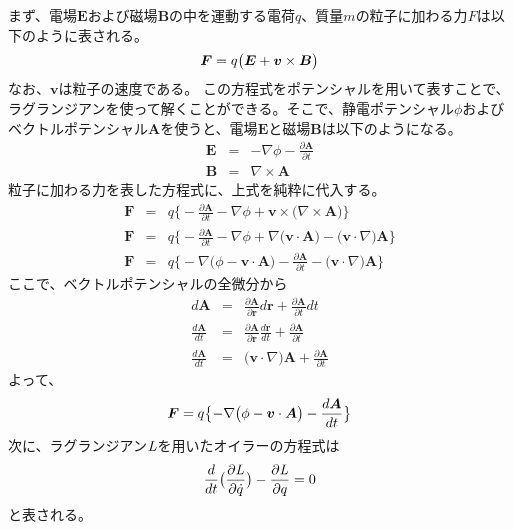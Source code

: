 \documentclass[11pt,a4paper]{jsarticle}
\begin{document}
まず、電場$\bm{E}$および磁場$\bm{B}$の中を運動する電荷$q$、質量$m$の粒子に加わる力$F$は以下のように表される。
\begin{equation}
  \bm{F} = q\bigl( \bm{E} + \bm{v} \times \bm{B} \bigr)\\
\end{equation}
なお、$\bm{v}$は粒子の速度である。
この方程式をポテンシャルを用いて表すことで、ラグランジアンを使って解くことができる。そこで、静電ポテンシャル$\phi$およびベクトルポテンシャル$\bm{A}$を使うと、電場$\bm{E}$と磁場$\bm{B}$は以下のようになる。
\begin{eqnarray}
  \bm{E} &=& - \nabla \phi - \frac{\partial \bm{A}}{\partial t} \\
  \bm{B} &=& \nabla \times \bm{A}
\end{eqnarray}
粒子に加わる力を表した方程式に、上式を純粋に代入する。
\begin{eqnarray}
  \bm{F} &=& q\bigl\{ -\frac{\partial \bm{A}}{\partial t} - \nabla \phi + \bm{v} \times \bigl( \nabla \times \bm{A} \bigr) \bigr\}\\
  \bm{F} &=& q\bigl\{ -\frac{\partial \bm{A}}{\partial t} - \nabla \phi + \nabla \bigl( \bm{v} \cdot \bm{A} \bigr) - \bigl( \bm{v} \cdot \nabla \bigr)\bm{A}\bigr\}\\
  \bm{F} &=& q\bigl\{ -\nabla \bigl( \phi - \bm{v} \cdot \bm{A} \bigr) - \frac{\partial \bm{A}}{\partial t} - \bigl( \bm{v} \cdot \nabla \bigr)\bm{A}\bigr\}
\end{eqnarray}
ここで、ベクトルポテンシャルの全微分から
\begin{eqnarray}
  d \bm{A} &=& \frac{\partial \bm{A}}{\partial \bm{r}} d \bm{r} + \frac{\partial \bm{A}}{\partial t} dt\\
  \frac{d \bm{A}}{dt} &=& \frac{\partial \bm{A}}{\partial \bm{r}} \frac{d \bm{r}}{dt} + \frac{\partial \bm{A}}{\partial t}\\
  \frac{d \bm{A}}{dt} &=& \bigl(\bm{v} \cdot \nabla \bigr)\bm{A} + \frac{\partial \bm{A}}{\partial t}
\end{eqnarray}
よって、
\begin{equation}
  \bm{F} = q\bigl\{ -\nabla \bigl( \phi - \bm{v} \cdot \bm{A} \bigr) -\frac{d \bm{A}}{dt} \bigr\}\\
\end{equation}
次に、ラグランジアン$\it{L}$を用いたオイラーの方程式は
\begin{equation}
  \frac{d}{dt}\bigl( \frac{\partial \it{L}}{\partial \dot{q}} \bigr) - \frac{\partial \it{L}}{\partial q} = 0\\
\end{equation}
と表される。
\end{document}
